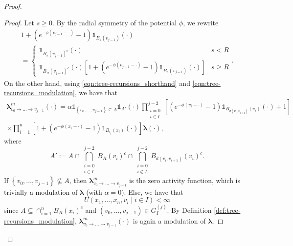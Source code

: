 \documentclass[11pt]{article}
\newcommand{\bl}{\bm{\lambda}}
\newcommand{\hcconst}{R}
\newcommand{\set}[1]{\left\{#1\right\}}
\newcommand{\indicator}[1]{\mathds{1}_{#1}}
\numberwithin{equation}{section}
\theoremstyle{plain}
\theoremstyle{definition}
\theoremstyle{remark}
\begin{document}
\begin{proof}
\begin{proof}
Let $s\ge 0$.
By the radial symmetry of the potential $\phi$, we rewrite 
\begin{equation}
\begin{multlined}
1+(e^{-\phi(v_{j-1}-\cdot)}-1)\indicator{B_{s}(v_{j-1})}(\cdot)
\\
=\begin{cases}
\indicator{B_{s}(v_{j-1})^{c}}(\cdot) & s<\hcconst \\
\indicator{B_{\hcconst}(v_{j-1})^{c}}(\cdot)\left[1+(e^{-\phi(v_{j-1}-\cdot)}-1)\indicator{B_{s}(v_{j-1})}(\cdot)\right] & s\ge\hcconst
\end{cases}.
\end{multlined}
\end{equation}
On the other hand, using \eqref{eqn:tree-recursions_shorthand} and \eqref{eqn:tree-recursions_modulation}, we have that
\begin{equation}
\label{eqn:tree-recursions_density-correspondence_interpolation_full-expansion}
\begin{multlined}
\bl^{m}_{v_{0}\rightarrow\dots\rightarrow v_{j-1}}(\cdot)
=\alpha
\indicator{\set{v_{0},\dots,v_{j-1}}\subseteq A}
\indicator{A'}(\cdot)
\prod_{\substack{i=0\\ i\in I}}^{j-2} 
\left[(e^{-\phi(v_{i}-\cdot)}-1)\indicator{B_{d(v_{i},v_{i+1})}(v_{i})}(\cdot)+1\right] 
\\
\times
\prod_{i=1}^{n}\left[1+(e^{-\phi(x_{i}-\cdot)}-1)\indicator{B_{t_{i}}(x_{i})}(\cdot)\right]\bl(\cdot),
\end{multlined}
\end{equation}
where 
\begin{equation}
A':=A\cap\bigcap_{\substack{i=0\\ i\in I}}^{j-2}B_{\hcconst}(v_{i})^{c}\cap\bigcap_{\substack{i=0\\ i\not\in I}}^{j-2}B_{d(v_{i},v_{i+1})}(v_{i})^{c}.
\end{equation}
If $\set{v_{0},\dots,v_{j-1}}\not\subseteq A$, then $\bl^{m}_{v_{0}\rightarrow\dots\rightarrow v_{j-1}}$ is the zero activity function, which is trivially a modulation of $\bl$ (with $\alpha=0$).
Else, we have that 
\begin{equation}
\label{eqn:tree-recursions_density-correspondence_interpolation_finite-potential-energy}
U(x_{1},\dots,x_{n},v_{i}\mid i\in I)<\infty
\end{equation}
since $A\subseteq\cap_{i=1}^{n}B_{\hcconst}(x_{i})^{c}$ and $(v_{0},\dots,v_{j-1})\in G^{(j)}_{I}$.
By Definition \ref{def:tree-recursions_modulation}, $\bl^{m}_{v_{0}\rightarrow\dots\rightarrow v_{j-1}}(\cdot)$ is again a modulation of $\bl$.
\end{proof}


\end{proof}
\end{document}
